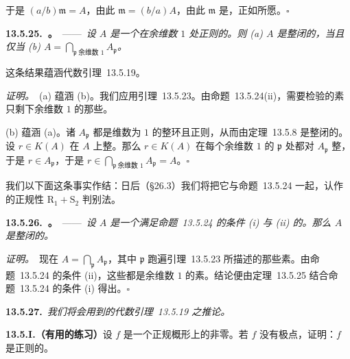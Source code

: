 于是 $(a/b)\mathfrak{m}=A$，由此 $\mathfrak{m}=(b/a)A$，由此 $\mathfrak{m}$ 是\trPrincipalIdeal，正如所愿。\hfill$\square$

\textbf{13.5.25.\ \trhTheorem{}。}\ ——\ \emph{设 $A$ 是一个在余维数 $1$ 处正则的\trNoetherian\trIntegralDomain。则 (a) $A$ 是整闭的，当且仅当 (b) $A=\bigcap_{\mathfrak{p}\ \text{余维数 }1}A_{\mathfrak{p}}$。}

这条结果蕴涵代数\trHartogs{}引理~13.5.19。

\emph{证明。}\ (a) 蕴涵 (b)。我们应用引理~13.5.23。由命题~13.5.24(ii)，需要检验的素只剩下余维数 $1$ 的那些。

(b) 蕴涵 (a)。诸 $A_{\mathfrak{p}}$ 都是维数为 $1$ 的\trNoetherian{}整环且正则，从而由定理~13.5.8 是整闭的。设 $r\in K(A)$ 在 $A$ 上整。那么 $r\in K(A)$ 在每个余维数 $1$ 的 $\mathfrak{p}$ 处都对 $A_{\mathfrak{p}}$ 整，于是 $r\in A_{\mathfrak{p}}$，于是 $r\in\bigcap_{\mathfrak{p}\ \text{余维数 }1}A_{\mathfrak{p}}=A$。\hfill$\square$

我们以下面这条事实作结：日后（\S26.3）我们将把它与命题~13.5.24 一起，认作\trSerre{}的正规性 $\mathrm{R}_1+\mathrm{S}_2$ 判别法。

\textbf{13.5.26.\ \trhProposition{}。}\ ——\ \emph{设 $A$ 是一个满足命题~13.5.24 的条件 (i) 与 (ii) 的\trNoetherian\trIntegralDomain。那么 $A$ 是整闭的。}

\emph{证明。}\ 现在 $A=\bigcap_{\mathfrak{p}}A_{\mathfrak{p}}$，其中 $\mathfrak{p}$ 跑遍引理~13.5.23 所描述的那些素。由命题~13.5.24 的条件 (ii)，这些都是余维数 $1$ 的素。结论便由定理~13.5.25 结合命题~13.5.24 的条件 (i) 得出。\hfill$\square$

\textbf{13.5.27.}\ \emph{我们将会用到的代数\trHartogs{}引理~13.5.19 之推论。}

\textbf{13.5.I.（有用的练习）}\quad 设 $f$ 是一个\trLocally\trNoetherian{}正规概形上的非零\trRationalFunction。若 $f$ 没有极点，证明：$f$ 是正则的。
